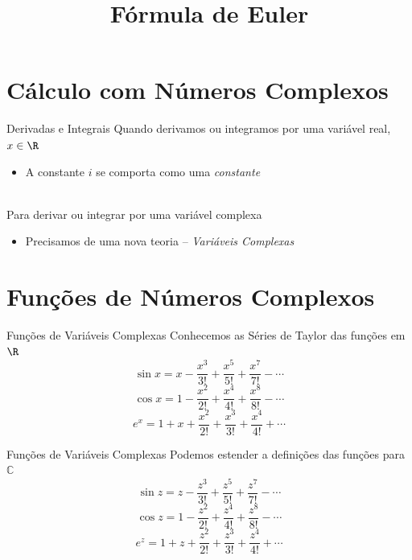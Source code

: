 \documentclass[fleqn,utf8,aspectratio=169,12pt]{beamer}
\title{Fórmula de Euler}
\begin{document}
\addtitle

\section{Cálculo com Números Complexos}

\begin{frame}{Derivadas e Integrais}
  Quando derivamos ou integramos por uma variável real, $x\in\R$
  \pause
  \begin{itemize}
    \item A constante \emph{\(i\)} se comporta como uma \emph{constante}
  \end{itemize}~\\

  \pause
  Para derivar ou integrar por uma variável complexa
  \pause
  \begin{itemize}
    \item Precisamos de uma nova teoria
    \pause
    --\emph{ Variáveis Complexas}
  \end{itemize}
\end{frame}

\section{Funções de Números Complexos}

\begin{frame}{Funções de Variáveis Complexas}
  Conhecemos as Séries de Taylor das funções em $\R$
  \pause
  \[
    \sin x = x - \frac{x^3}{3!} + \frac{x^5}{5!} + \frac{x^7}{7!} - \cdots
  \]
  \pause
  \[
    \cos x = 1 - \frac{x^2}{2!} + \frac{x^4}{4!} + \frac{x^8}{8!} - \cdots
  \]
  \pause
  \[
    e^x = 1 + x + \frac{x^2}{2!} + \frac{x^3}{3!} + \frac{x^4}{4!} +  \cdots
  \]
\end{frame}

\begin{frame}{Funções de Variáveis Complexas}
  Podemos estender a definições das funções para \(\mathbb{C}\)
  \pause
  \[
    \sin z = z - \frac{z^3}{3!} + \frac{z^5}{5!} + \frac{z^7}{7!} - \cdots
  \]
  \pause
  \[
    \cos z = 1 - \frac{z^2}{2!} + \frac{z^4}{4!} + \frac{z^8}{8!} - \cdots
  \]
  \pause
  \[
    e^z = 1 + z + \frac{z^2}{2!} + \frac{z^3}{3!} + \frac{z^4}{4!} +  \cdots
  \]
\end{frame}
\end{document}
